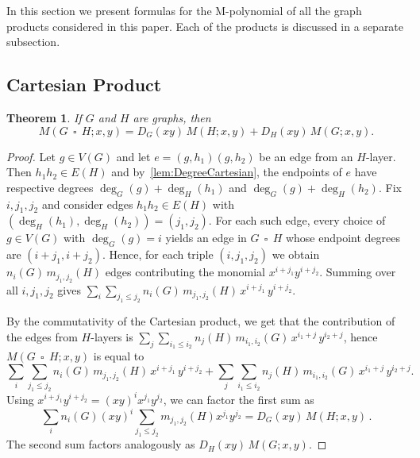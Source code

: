 \documentclass[letterpaper,12pt]{article}
\newtheorem{theorem}{Theorem}[section]
\DeclareMathOperator{\cp}{\,\square\,}
\begin{document}
In this section we present formulas for the M-polynomial of all the graph products considered in this paper. Each of the products is discussed in a separate subsection.

\subsection{Cartesian Product}
 \label{sec:Cartesian}

\begin{theorem}\label{thm:cartesian}
If $G$ and $H$ are graphs, then 
\begin{equation}\label{eq:CartesianCompact}
    M(G\cp H;x,y)=D_G(xy)\,M(H;x,y)+D_H(xy)\,M(G;x,y).
\end{equation}

\end{theorem}

\begin{proof}
Let $g\in V(G)$ and let $e = (g,h_1)(g,h_2)$ be an edge from an $H$-layer. Then $h_1h_2\in E(H)$ and by~\eqref{lem:DegreeCartesian}, the endpoints of $e$ have respective degrees $\deg_G(g)+\deg_H(h_1)$ and $\deg_G(g)+\deg_H(h_2)$.
Fix $i,j_1,j_2$ and consider edges $h_1h_2\in E(H)$ with 
    $(\deg_H(h_1),\deg_H(h_2))=(j_1,j_2)$.  
    For each such edge, every choice of $g\in V(G)$ with $\deg_G(g)=i$
    yields an edge in $G\cp H$ whose endpoint degrees are
    $(i+j_1,i+j_2)$.  
    Hence, for each triple $(i,j_1,j_2)$ we obtain
    $n_i(G)\, m_{j_1,j_2}(H)$ edges contributing the monomial 
    $x^{i+j_1}y^{i+j_2}$.  
    Summing over all $i,j_1,j_2$ gives $\sum_{i}\sum_{j_1\le j_2}
n_i(G)\, m_{j_1,j_2}(H)\,
x^{i+j_1}\, y^{i+j_2}$.

By the commutativity of the Cartesian product, we get that the contribution of the edges from $H$-layers is $\sum_{j}\sum_{i_1\le i_2} n_j(H)\, m_{i_1,i_2}(G)\, x^{i_1+j}\, y^{i_2+j}$, hence $ M(G\cp H;x,y)$ is equal to
\begin{equation*}
\sum_{i}\sum_{j_1\le j_2}
n_i(G)\, m_{j_1,j_2}(H)\,
x^{i+j_1}\, y^{i+j_2}
+
\sum_{j}\sum_{i_1\le i_2}
n_j(H)\, m_{i_1,i_2}(G)\,
x^{i_1+j}\, y^{i_2+j}.
\end{equation*}
Using $x^{i+j_1}y^{i+j_2}=(xy)^i x^{j_1}y^{j_2}$, we can factor the first sum as
\[
\sum_i n_i(G)(xy)^i \sum_{j_1\le j_2} m_{j_1,j_2}(H)x^{j_1}y^{j_2}
=
D_G(xy)\,M(H;x,y)\,.
\]
The second sum factors analogously as $D_H(xy)\,M(G;x,y)$.
\end{proof}
\end{document}
